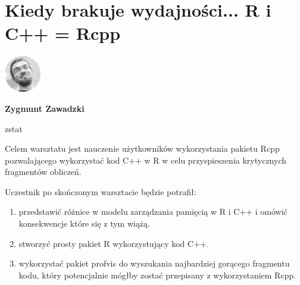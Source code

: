 \documentclass[\main/boa.tex]{subfiles}
\begin{document}
\section{Kiedy brakuje wydajności... R i C++ = Rcpp}
\begin{minipage}[t]{0.915\textwidth}
	\center     
    \includegraphics[width=60px]{img/workshops/czarno_biale/zygmunt-crop.png} 
\end{minipage}

\begin{minipage}{0.915\textwidth}
\centering
{\bf {} Zygmunt Zawadzki}
\end{minipage}

\vskip 0.3cm

\begin{affiliations}
\begin{minipage}{0.915\textwidth}
\centering
\large zstat  \\[2pt]
\end{minipage}
\end{affiliations}

\vskip 0.8cm

\opiswarsztatu Celem warsztatu jest nauczenie użytkowników wykorzystania pakietu Rcpp pozwalającego wykorzystać kod C++ w R w celu przyspieszenia krytycznych fragmentów obliczeń.

Uczestnik po skończonym warsztacie będzie potrafił:
\begin{enumerate}
\item przedstawić różnice w modelu zarządzania pamięcią w R i C++ i omówić konsekwencje które się z tym wiążą.
\item stworzyć prosty pakiet R wykorzystujący kod C++.
\item wykorzystać pakiet profvis do wyszukania najbardziej gorącego fragmentu kodu, który potencjalnie mógłby zostać przepisany z wykorzystaniem Rcpp.
\end{enumerate}
\end{document}
